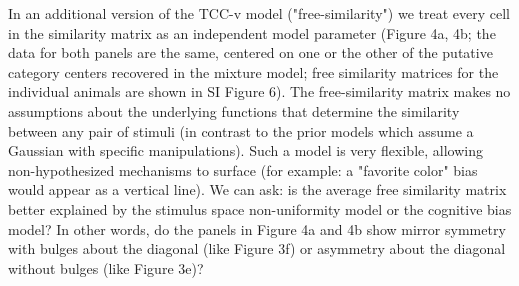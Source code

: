 \documentclass[9pt,biorxiv,lineno,onehalfspacing]{lapreprint}
\begin{document}
\begin{refsection}
In an additional version of the TCC-v model ("free-similarity") we treat every cell in the similarity matrix as an independent model parameter (Figure 4a, 4b; the data for both panels are the same, centered on one or the other of the putative category centers recovered in the mixture model; free similarity matrices for the individual animals are shown in SI Figure 6). 
The free-similarity matrix makes no assumptions about the underlying functions that determine the similarity between any pair of stimuli (in contrast to the prior models which assume a Gaussian with specific manipulations). 
Such a model is very flexible, allowing non-hypothesized mechanisms to surface (for example: a "favorite color" bias would appear as a vertical line).
We can ask: is the average free similarity matrix better explained by the stimulus space non-uniformity model or the cognitive bias model? 
In other words, do the panels in Figure 4a and 4b show mirror symmetry with bulges about the diagonal (like Figure 3f) or asymmetry about the diagonal without bulges (like Figure 3e)? 


\end{refsection}
\end{document}
